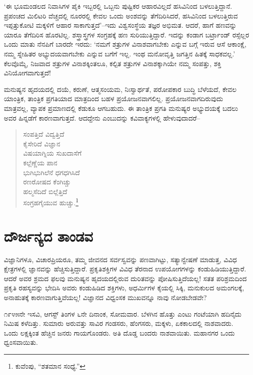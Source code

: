 ‘ಈ ಭೂಮಂಡಲದ ನಿವಾಸಿಗಳ ಪೈಕಿ ಇಬ್ಬರಲ್ಲಿ ಒಬ್ಬನು ಪುಷ್ಟಿಕರ ಆಹಾರವಿಲ್ಲದೆ ಹಸಿವಿನಿಂದ ಬಳಲುತ್ತಿದ್ದಾನೆ. ಪ್ರಪಂಚದ ಮಿಲಿಟರಿ ವೆಚ್ಚದಲ್ಲಿ ನೂರರಲ್ಲಿ ಕೇವಲ ಒಂದು ಅಂಶವನ್ನು ತೆಗೆದಿರಿಸಿದರೆ, ಹಸಿವಿನಿಂದ ಬಳಲುತ್ತಿರುವ ಇಪ್ಪತ್ತುಕೋಟಿ ಮಕ್ಕಳಿಗೆ ಆಹಾರ ಸಾಕಾಗುತ್ತದೆ’–ಇದು ವಿಶ್ವಸಂಸ್ಥೆಯ ತಜ್ಞರ ಅಭಿಮತ. ಆದರೆ, ಹಾಗೆ ಹಣವನ್ನು ಯಾರೂ ತೆಗೆದಿರಿಸ ಹೊರಟಿಲ್ಲ. ಶಸ್ತ್ರಾಸ್ತ್ರಗಳ ಸಂಗ್ರಹಕ್ಕೆ ಹಣ ಸುರಿಯುತ್ತಿದ್ದಾರೆ. ಇದನ್ನು ಕಂಡಾಗ ಬರ್ಟ್ರಾಂಡ್ ರಸ್ಸೆಲ್ಲರ ಒಂದು ಮಾತು ನೆನಪಿಗೆ ಬಾರದೇ ಇರದು: ‘ನಮಗೆ ಶತ್ರುಗಳ ವಿನಾಶವಾಗಬೇಕು ಎನ್ನುವ ಬಗ್ಗೆ ಇರುವ ಆಸೆ ಆಕಾಂಕ್ಷೆ, ನಮ್ಮ ಸ್ನೇಹಿತರ ಅಭ್ಯುದಯವಾಗಬೇಕು ಎನ್ನುವ ಬಗೆಗೆ ಇಲ್ಲ. ಇಂಥ ಮನೋವೃತ್ತಿ ಜಗತ್ತಿನ ಹಿತಕ್ಕೆ ಸಾಧಕವಲ್ಲ.’ ಕೆಲವೊಮ್ಮೆ, ನಿಜವಾದ ಶತ್ರುಗಳ ವಿನಾಶಕ್ಕಿಂತಲೂ, ಕಲ್ಪಿತ ಶತ್ರುಗಳ ವಿನಾಶಕ್ಕಾಗಿಯೇ ನಮ್ಮ ಸಂಪತ್ತು, ಶಕ್ತಿ ವಿನಿಯೋಗವಾಗುತ್ತದೆ!

ಮನುಷ್ಯನ ಹೃದಯದಲ್ಲಿ ದಯೆ, ಕರುಣೆ, ಆತ್ಮಸಂಯಮ, ನಿಃಸ್ವಾರ್ಥತೆ, ಪರೋಪಕಾರ ಬುದ್ಧಿ ಬೆಳೆಯದೆ, ಕೇವಲ ಯಾಂತ್ರಿಕ, ತಾಂತ್ರಿಕ ಪ್ರಗತಿಯಾದ ಮಾತ್ರದಿಂದ ಬಹಳ ಪ್ರಯೋಜನ\-ವಾಗಲಿಲ್ಲ. ಪ್ರಯೋಜನವಾಗದಿರುವುದು ಮಾತ್ರವಲ್ಲ, ವ್ಯಾಪಕ ಪ್ರಮಾಣದಲ್ಲಿ ಕೆಡುಕೂ ಆಗಬಹುದು. ಈ ತಾಂತ್ರಿಕ ಪ್ರಗತಿ ಮನುಷ್ಯರ ಅಭ್ಯುದಯಕ್ಕೆ ಬದಲು ಅವರ ಹಿನ್ನಡೆಗೆ ಕಾರಣವಾಗುತ್ತದೆ. ಆದದ್ದೇನು ಎಂಬುದನ್ನು ಕವಿವಾಕ್ಯಗಳಲ್ಲಿ ಹೇಳುವುದಾದರೆ–

\begin{verse}
ಸಂಪತ್ತಿದೆ ವಿದ್ವತ್ತಿದೆ\\
 ಕೈಸೇರಿದೆ ವಿಜ್ಞಾನ\\
 ವಿಷಯಾಗ್ನಿಯ ಸುಖದಾಸೆಗೆ\\
 ಕಲ್ಲೆಣ್ಣೆಯ ಪಾನ\\ 
 ಭುಗಿಭುಗಿಲೆನೆ ಧಗಧಗಿಸಿದೆ\\
 ರಣರೋಷದ ಕೆಂಗಿಚ್ಚು\\ 
 ಹಲ್ಮಸೆದಿದೆ ಬಿಲ್ಲೆತ್ತಿದೆ\\ 
 ಸಂಗ್ರಹಗೈಯುವ ಹುಚ್ಚು.\footnote{ಕುವೆಂಪು, “ಶತಮಾನ ಸಂಧ್ಯೆ.”}
\end{verse}


\section*{ದೌರ್ಜನ್ಯದ ತಾಂಡವ}


ವಿಜ್ಞಾನಿಗಳೂ, ವಿಚಾರಪ್ರಿಯರೂ, ತಮ್ಮ ಜೀವನದ ಸರ್ವಸ್ವವನ್ನು ಪಣವಾಗಿಟ್ಟು, ಸತ್ಯಾನ್ವೇಷಣೆ ಮಾಡುತ್ತ, ವಿವಿಧ ಕ್ಷೇತ್ರಗಳಲ್ಲಿ ಜ್ಞಾನವನ್ನು ಹೆಚ್ಚಿಸುತ್ತಿದ್ದಾರೆ. ಪ್ರಕೃತಿಶಕ್ತಿಗಳ ವಿವಿಧ ತೆರನಾದ ಉಪಯೋಗಗಳನ್ನು ಕಂಡುಹಿಡಿಯುತ್ತಿದ್ದಾರೆ. ಆದರೆ ಅವರ ಶ್ರಮದ ಫಲವು ಮನುಷ್ಯನ ಹೃದಯದಲ್ಲಿರುವ ದುರಿತವನ್ನು ಪೋಷಿಸುತ್ತಿದೆಯಲ್ಲ! ಸತತ ಪರಿಶ್ರಮದಿಂದ ಪ್ರಕೃತಿ ರಹಸ್ಯವನ್ನು ಭೇದಿಸಿ ಅವರು ಕಂಡುಹಿಡಿದ ಶಕ್ತಿಗಳು, ಅಧರ್ಮಿಗಳ ಕೈಯಲ್ಲಿ ಸಿಕ್ಕಿ, ಮನುಕುಲದ ಅಮಂಗಲಕ್ಕೆ, ಅನಾಹುತಕ್ಕೆ ಕಾರಣವಾಗುತ್ತಿವೆಯಲ್ಲ! ವಿಜ್ಞಾನದ ವಿಧ್ವಂಸಕ ಮುಖವನ್ನೂ ನಾವು ನೋಡಬೇಡವೇ?

೧೯೪೫ನೇ ಇಸವಿ, ಆಗಸ್ಟ್ ತಿಂಗಳ ೬ನೇ ದಿನಾಂಕ, ಸೋಮವಾರ. ಬೆಳಗಿನ ಹೊತ್ತು ಎಂಟು ಗಂಟೆಯಾಗಿ ಹದಿನೈದು ನಿಮಿಷ ಕಳೆದಿತ್ತು. ಸುಮಾರು ಅರುವತ್ತು ಸಾವಿರ ಗಂಡಸರು, ಹೆಂಗಸರು, ಮಕ್ಕಳು, ಏಕಕಾಲದಲ್ಲಿ ನಾಶವಾದರು. ಒಂದು ಲಕ್ಷಕ್ಕಿಂತ ಹೆಚ್ಚಿನ ಜನರು ಗಾಯಗೊಂಡರು. ಅತಿ ದೊಡ್ಡ ಬಂದರು ನಾಶವಾಯಿತು. ಮಹಾನಗರ ಒಂದು ಧ್ವಂಸವಾಯಿತು.

